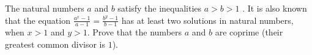 The natural numbers $a$ and $b$ satisfy the inequalities $a > b > 1$ .  It is also known that the equation
$\frac{a^x - 1}{a - 1}=\frac{b^y - 1}{b - 1}$ has at least two solutions in natural numbers, when $x > 1$ and $y > 1$.
Prove that the numbers $a$ and $b$ are coprime (their greatest common divisor is $1$).